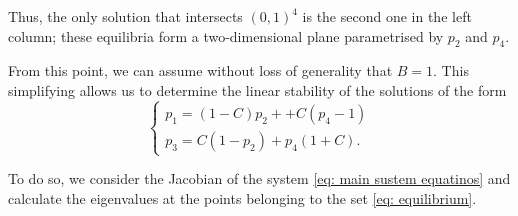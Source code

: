 \documentclass{article}
\theoremstyle{definition}
\numberwithin{equation}{section}
\begin{document}
Thus, the only solution that intersects $(0,1)^4$ is the second one in the left column; these equilibria form a two-dimensional plane parametrised by $p_2$ and $p_4$.

From this point, we can assume without loss of generality that $B=1$. This simplifying allows us to determine the linear stability of the solutions of the form
\begin{equation}
\label{eq: equilibrium}
\begin{cases}
    p_1 = (1-C)p_2 + + C(p_4-1)\\
    p_3 = C(1-p_2) + p_4(1 + C).
\end{cases}
\end{equation}

To do so, we consider the Jacobian of the system \eqref{eq: main sustem equatinos} and calculate the eigenvalues at the points belonging to the set \eqref{eq: equilibrium}.
\end{document}
